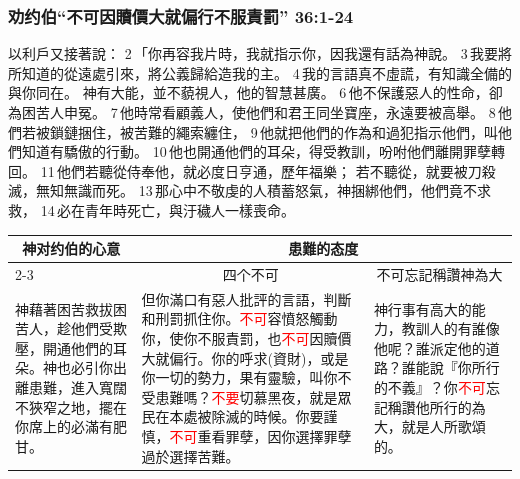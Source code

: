 \subsubsection{劝约伯“不可因贖價大就偏行不服責罰” 36:1-24}
以利戶又接著說： 2 「你再容我片時，我就指示你，因我還有話為神說。 3 我要將所知道的從遠處引來，將公義歸給造我的主。 4 我的言語真不虛謊，有知識全備的與你同在。
神有大能，並不藐視人，他的智慧甚廣。 6 他不保護惡人的性命，卻為困苦人申冤。 7 他時常看顧義人，使他們和君王同坐寶座，永遠要被高舉。 8 他們若被鎖鏈捆住，被苦難的繩索纏住， 9 他就把他們的作為和過犯指示他們，叫他們知道有驕傲的行動。 10 他也開通他們的耳朵，得受教訓，吩咐他們離開罪孽轉回。 11 他們若聽從侍奉他，就必度日亨通，歷年福樂；
若不聽從，就要被刀殺滅，無知無識而死。 13 那心中不敬虔的人積蓄怒氣，神捆綁他們，他們竟不求救， 14 必在青年時死亡，與汙穢人一樣喪命。
\begin{table}[H]
\centering
\begin{tabular}{p{4.15cm}|p{8.7500cm}|p{4.350cm}}\hline\hline
\multicolumn{1}{c|}{神对约伯的心意}&\multicolumn{2}{c}{患難的态度}\\\cline{2-3}
&\multicolumn{1}{c|}{四个不可}&\multicolumn{1}{c}{不可忘記稱讚神為大}\\\hline
神藉著困苦救拔困苦人，趁他們受欺壓，開通他們的耳朵。神也必引你出離患難，進入寬闊不狹窄之地，擺在你席上的必滿有肥甘。
&但你滿口有惡人批評的言語，判斷和刑罰抓住你。\textcolor{red}{不可}容憤怒觸動你，使你不服責罰，也\textcolor{red}{不可}因贖價大就偏行。你的呼求(資財)，或是你一切的勢力，果有靈驗，叫你不受患難嗎？\textcolor{red}{不要}切慕黑夜，就是眾民在本處被除滅的時候。你要謹慎，\textcolor{red}{不可}重看罪孽，因你選擇罪孽過於選擇苦難。
&神行事有高大的能力，教訓人的有誰像他呢？誰派定他的道路？誰能說『你所行的不義』？你\textcolor{red}{不可}忘記稱讚他所行的為大，就是人所歌頌的。\\\hline
\end{tabular}
\end{table} 


